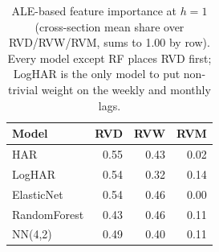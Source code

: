 \documentclass[twocolumn,9pt]{extarticle}
\begin{document}
\begin{table}[H]
\centering\small
\caption{ALE-based feature importance at $h=1$ (cross-section mean
share over RVD/RVW/RVM, sums to 1.00 by row).  Every model except
RF places RVD first; LogHAR is the only model to put non-trivial
weight on the weekly and monthly lags.}
\label{tab:ale}
\begin{tabular}{lrrr}
\toprule
Model        & RVD  & RVW  & RVM \\
\midrule
HAR          & 0.55 & 0.43 & 0.02 \\
LogHAR       & 0.54 & 0.32 & 0.14 \\
ElasticNet   & 0.54 & 0.46 & 0.00 \\
RandomForest & 0.43 & 0.46 & 0.11 \\
NN(4,2)      & 0.49 & 0.40 & 0.11 \\
\bottomrule
\end{tabular}
\end{table}
\end{document}
